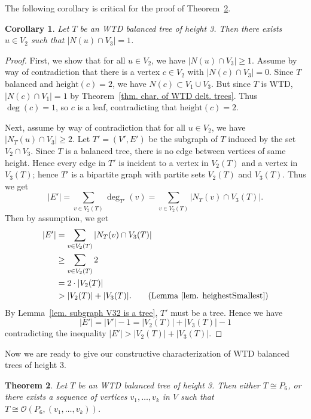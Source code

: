 \documentclass[12pt, reqno]{amsart}
\theoremstyle{definition}
\theoremstyle{plain}
\newtheorem{theorem}{Theorem}[section]
\newtheorem{corollary}[theorem]{Corollary}
\theoremstyle{definition}
\newcommand{\hh}{\mbox{height}}
\begin{document}
The following corollary is critical for the proof of Theorem~\ref{thm. constructing hh = 3 delt. trees}.

\begin{corollary}\label{cor. hh = 2 of upper deg 1 exists}
    Let $T$ be an WTD balanced tree of height 3.
    Then there exists $u \in V_2$ such that $|N(u) \cap V_3| = 1$.
\end{corollary}

\begin{proof}
    First, we show that for all $u \in V_2$, we have $|N(u) \cap V_3| \geq 1$.
    Assume by way of contradiction that there is a vertex $c \in V_2$ with $|N(c) \cap V_3| = 0$.
    Since $T$ balanced and $\hh(c) = 2$, we have $N(c) \subset V_1 \cup V_3$.
    But since $T$ is WTD, $|N(c) \cap V_1| = 1$ by Theorem~\ref{thm. char. of WTD delt. trees}.
    Thus $\deg(c) = 1$, so $c$ is a leaf, contradicting that $\hh(c) = 2$.

    Next, assume by way of contradiction that for all $u \in V_2$, we have $|N_T(u) \cap V_3| \geq 2$.
    Let $T' = (V',E')$ be the subgraph of $T$ induced by the set $V_2 \cap V_3$.
    Since $T$ is a balanced tree, there is no edge between vertices of same height.
    Hence every edge in $T'$ is incident to a vertex in $V_2(T)$ and a vertex in $V_3(T)$; hence $T'$ is a bipartite graph with partite sets $V_2(T)$ and $V_3(T)$.
    Thus we get 
    $$
    |E'| = \sum_{v \in V_2(T)} \deg_{T'}(v) = \sum_{v \in V_2(T)} |N_T(v) \cap V_3(T)|.
    $$
    Then by assumption, we get
    \begin{align*}
        |E'| &= \sum_{v \in V_2(T)} |N_T(v) \cap V_3(T)|\\
        &\geq \sum_{v \in V_2(T)} 2\\
        &= 2 \cdot |V_2(T)|\\
        &> |V_2(T)| + |V_3(T)|. \tag{Lemma~\ref{lem. heighestSmallest}}
    \end{align*}
    By Lemma~\ref{lem. subgraph V32 is a tree}, $T'$ must be a tree.
    Hence we have 
    $$
    |E'| = |V'| - 1 = |V_2(T)| + |V_3(T)| - 1
    $$ 
    contradicting the inequality $|E'| > |V_2(T)| + |V_3(T)|$.
\end{proof}

Now we are ready to give our constructive characterization of WTD balanced trees of height 3.

\begin{theorem}\label{thm. constructing hh = 3 delt. trees}
    Let $T$ be an WTD balanced tree of height 3.
    Then either $T \cong P_6$, or there exists a sequence of vertices $v_1,\dots,v_k$ in $V$ such that $T \cong \mathcal{O}(P_6,(v_1,\dots,v_k))$.
\end{theorem}
\end{document}
